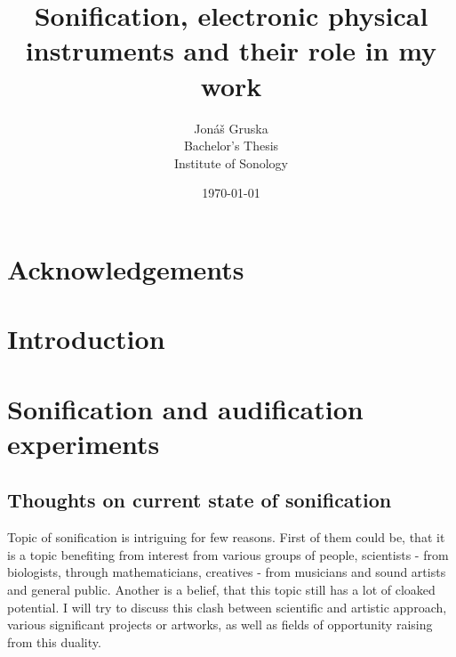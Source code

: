 \documentclass[11pt,a4paper,oneside]{report}
\begin{document}
\title{Sonification, electronic physical instruments and their role in my work}
\author{Jonáš Gruska\\
				Bachelor's Thesis\\
				Institute of Sonology}
\date{\today}

\maketitle

\begin{abstract}
\end{abstract}

\chapter*{Acknowledgements}

\tableofcontents

\chapter{Introduction}

\chapter{Sonification and audification experiments}

\section{Thoughts on current state of sonification}
Topic of sonification is intriguing for few reasons. First of them could be, that it is a topic benefiting from interest from various groups of people, scientists - from biologists, through mathematicians, creatives - from musicians and sound artists and general public. Another is a belief, that this topic still has a lot of cloaked potential. I will try to discuss this clash between scientific and artistic approach, various significant projects or artworks, as well as fields of opportunity raising from this duality.
\end{document}
